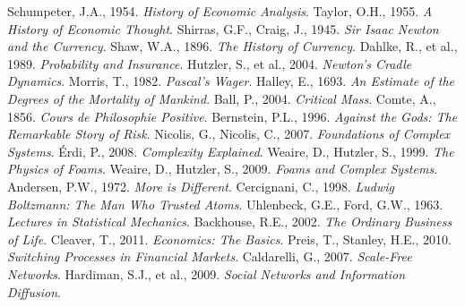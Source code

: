 \documentclass[a4paper,12pt]{book}
\begin{document}
\begin{thebibliography}{9}
 Schumpeter, J.A., 1954. \textit{History of Economic Analysis}.
 Taylor, O.H., 1955. \textit{A History of Economic Thought}.
 Shirras, G.F., Craig, J., 1945. \textit{Sir Isaac Newton and the Currency}.
 Shaw, W.A., 1896. \textit{The History of Currency}.
 Dahlke, R., et al., 1989. \textit{Probability and Insurance}.
 Hutzler, S., et al., 2004. \textit{Newton’s Cradle Dynamics}.
 Morris, T., 1982. \textit{Pascal’s Wager}.
 Halley, E., 1693. \textit{An Estimate of the Degrees of the Mortality of Mankind}.
 Ball, P., 2004. \textit{Critical Mass}.
 Comte, A., 1856. \textit{Cours de Philosophie Positive}.
 Bernstein, P.L., 1996. \textit{Against the Gods: The Remarkable Story of Risk}.
 Nicolis, G., Nicolis, C., 2007. \textit{Foundations of Complex Systems}.
 Érdi, P., 2008. \textit{Complexity Explained}.
 Weaire, D., Hutzler, S., 1999. \textit{The Physics of Foams}.
 Weaire, D., Hutzler, S., 2009. \textit{Foams and Complex Systems}.
 Andersen, P.W., 1972. \textit{More is Different}.
 Cercignani, C., 1998. \textit{Ludwig Boltzmann: The Man Who Trusted Atoms}.
 Uhlenbeck, G.E., Ford, G.W., 1963. \textit{Lectures in Statistical Mechanics}.
 Backhouse, R.E., 2002. \textit{The Ordinary Business of Life}.
 Cleaver, T., 2011. \textit{Economics: The Basics}.
 Preis, T., Stanley, H.E., 2010. \textit{Switching Processes in Financial Markets}.
 Caldarelli, G., 2007. \textit{Scale-Free Networks}.
 Hardiman, S.J., et al., 2009. \textit{Social Networks and Information Diffusion}.
\end{thebibliography}
\end{document}
